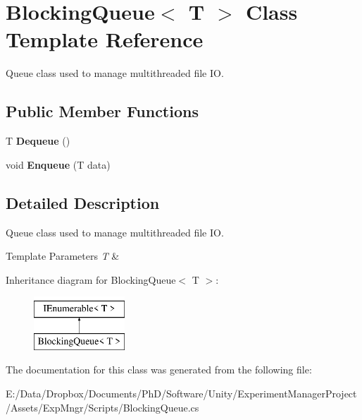 \hypertarget{class_blocking_queue}{}\section{Blocking\+Queue$<$ T $>$ Class Template Reference}
\label{class_blocking_queue}


Queue class used to manage multithreaded file IO.  


\subsection*{Public Member Functions}
\begin{DoxyCompactItemize}
\item 
\mbox{\label{class_blocking_queue_afa720f21216549ba5c8e77e33832f476}} 
T {\bfseries Dequeue} ()
\item 
\mbox{\label{class_blocking_queue_aa0866eb4e2bbf8d5f9bb1196d5f92902}} 
void {\bfseries Enqueue} (T data)
\end{DoxyCompactItemize}


\subsection{Detailed Description}
Queue class used to manage multithreaded file IO. 


\begin{DoxyTemplParams}{Template Parameters}
{\em T} & \\
\hline
\end{DoxyTemplParams}
Inheritance diagram for Blocking\+Queue$<$ T $>$\+:\begin{figure}[H]
\begin{center}
\leavevmode
\includegraphics[height=2.000000cm]{class_blocking_queue}
\end{center}
\end{figure}


The documentation for this class was generated from the following file\+:\begin{DoxyCompactItemize}
\item 
E\+:/\+Data/\+Dropbox/\+Documents/\+Ph\+D/\+Software/\+Unity/\+Experiment\+Manager\+Project/\+Assets/\+Exp\+Mngr/\+Scripts/Blocking\+Queue.\+cs\end{DoxyCompactItemize}
